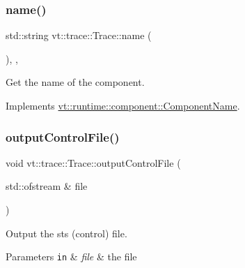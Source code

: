 \subsubsection{\texorpdfstring{name()}{name()}}
{\footnotesize\ttfamily std\+::string vt\+::trace\+::\+Trace\+::name (\begin{DoxyParamCaption}{ }\end{DoxyParamCaption})\hspace{0.3cm}{\ttfamily [inline]}, {\ttfamily [override]}, {\ttfamily [virtual]}}



Get the name of the component. 



Implements \hyperlink{structvt_1_1runtime_1_1component_1_1_component_name_a33c06229bb605a2b2ceff68830d6d773}{vt\+::runtime\+::component\+::\+Component\+Name}.

\mbox{\label{structvt_1_1trace_1_1_trace_a90d5f7400d362293c78f041cb42fce35}} 
\subsubsection{\texorpdfstring{output\+Control\+File()}{outputControlFile()}}
{\footnotesize\ttfamily void vt\+::trace\+::\+Trace\+::output\+Control\+File (\begin{DoxyParamCaption}\item[{std\+::ofstream \&}]{file }\end{DoxyParamCaption})\hspace{0.3cm}{\ttfamily [private]}}



Output the sts (control) file. 


\begin{DoxyParams}[1]{Parameters}
\mbox{\tt in}  & {\em file} & the file \\
\hline
\end{DoxyParams}
\mbox{\label{structvt_1_1trace_1_1_trace_aefd9cc22457e4a086c0705f7a850375c}} 
